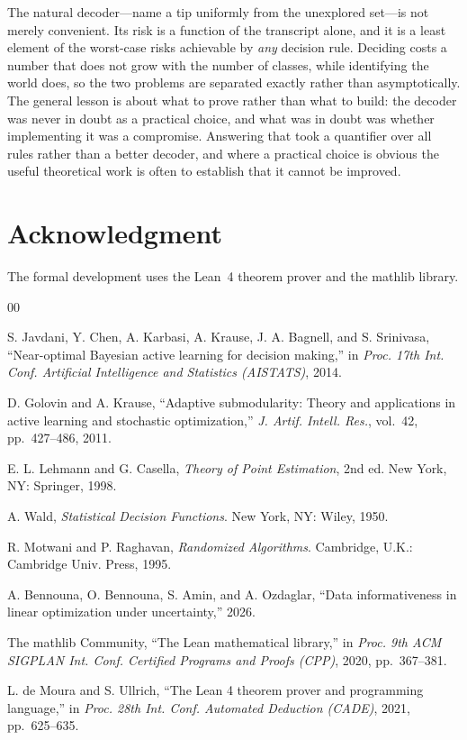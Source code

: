 \documentclass[conference]{IEEEtran}
\theoremstyle{definition}
\begin{document}
The natural decoder---name a tip uniformly from the unexplored set---is not merely convenient.
Its risk is a function of the transcript alone, and it is a least element of the worst-case
risks achievable by \emph{any} decision rule. Deciding costs a number that does not grow with
the number of classes, while identifying the world does, so the two problems are separated
exactly rather than asymptotically. The general lesson is about what to prove rather than what
to build: the decoder was never in doubt as a practical choice, and what was in doubt was
whether implementing it was a compromise. Answering that took a quantifier over all rules
rather than a better decoder, and where a practical choice is obvious the useful theoretical
work is often to establish that it cannot be improved.

\section*{Acknowledgment}

The formal development uses the Lean~4 theorem prover and the mathlib library.

\begin{thebibliography}{00}

 S. Javdani, Y. Chen, A. Karbasi, A. Krause, J. A. Bagnell, and
S. Srinivasa, ``Near-optimal Bayesian active learning for decision making,'' in
\emph{Proc. 17th Int. Conf. Artificial Intelligence and Statistics (AISTATS)}, 2014.

 D. Golovin and A. Krause, ``Adaptive submodularity: Theory and
applications in active learning and stochastic optimization,'' \emph{J. Artif. Intell. Res.},
vol.~42, pp.~427--486, 2011.

 E. L. Lehmann and G. Casella, \emph{Theory of Point Estimation},
2nd ed. New York, NY: Springer, 1998.

 A. Wald, \emph{Statistical Decision Functions}. New York, NY: Wiley, 1950.

 R. Motwani and P. Raghavan, \emph{Randomized Algorithms}. Cambridge,
U.K.: Cambridge Univ. Press, 1995.

 A. Bennouna, O. Bennouna, S. Amin, and A. Ozdaglar, ``Data
informativeness in linear optimization under uncertainty,'' 2026.

 The mathlib Community, ``The Lean mathematical library,'' in
\emph{Proc. 9th ACM SIGPLAN Int. Conf. Certified Programs and Proofs (CPP)}, 2020,
pp.~367--381.

 L. de Moura and S. Ullrich, ``The Lean 4 theorem prover and
programming language,'' in \emph{Proc. 28th Int. Conf. Automated Deduction (CADE)}, 2021,
pp.~625--635.

\end{thebibliography}


\end{document}
